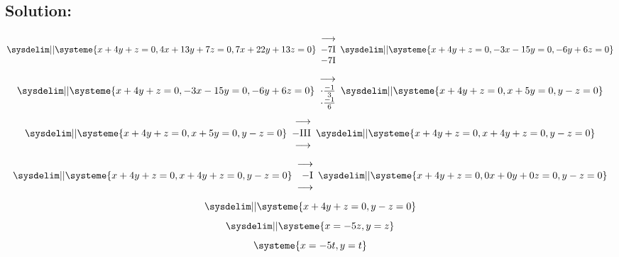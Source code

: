 \documentclass{article}
\begin{document}
\subsection*{Solution:}
\begin{equation}
    \sysdelim||\systeme{
        x + 4y + z = 0,
        4x + 13y + 7z = 0,
        7x + 22y + 13z = 0
    }
    \begin{array}{rr}
        \longrightarrow \\
        -7$I$ \\
        -7$I$ \\
    \end{array}
    \sysdelim||\systeme{
        x + 4y + z = 0,
        -3x - 15y = 0,
        -6y + 6z = 0
    }
\end{equation}
\begin{equation}
    \sysdelim||\systeme{
        x + 4y + z = 0,
        -3x - 15y = 0,
        -6y + 6z = 0
    }
    \begin{array}{rr}
        \longrightarrow \\
        \cdot \frac{-1}{3} \\
        \cdot \frac{-1}{6} \\
    \end{array}
    \sysdelim||\systeme{
        x + 4y + z = 0,
        x + 5y = 0,
        y - z = 0
    }
\end{equation}
\begin{equation}
    \sysdelim||\systeme{
        x + 4y + z = 0,
        x + 5y = 0,
        y - z = 0
    }
    \begin{array}{rr}
        \longrightarrow \\
        -$III$\\
        \longrightarrow \\
    \end{array}
    \sysdelim||\systeme{
        x + 4y + z = 0,
        x + 4y + z = 0,
        y - z = 0
    }
\end{equation}
\begin{equation}
    \sysdelim||\systeme{
        x + 4y + z = 0,
        x + 4y + z = 0,
        y - z = 0
    }
    \begin{array}{rr}
        \longrightarrow \\
        -$I$\\
        \longrightarrow \\
    \end{array}
    \sysdelim||\systeme{
        x + 4y + z = 0,
        0x + 0y + 0z = 0,
        y - z = 0
    }
\end{equation}
\begin{equation}
    \sysdelim||\systeme{
        x + 4y + z = 0,
        y - z = 0
    }
\end{equation}
\begin{equation}
    \sysdelim||\systeme{
        x = - 5z,
        y = z
    }
\end{equation}
\begin{equation}
    \systeme{
        x = - 5t,
        y = t
    }
\end{equation}
\noindent\makebox[\linewidth]{\rule{16cm}{0.4pt}}
\end{document}
